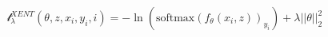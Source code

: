 \documentclass[preview]{standalone}
\begin{document}
\begin{align*}
\mathcal{l}_{\lambda}^{XENT}(\theta, z, x_i, y_i, i) = - \ln(\text{softmax}(f_{\theta}(x_i, z))_{y_i}) + \lambda \left|\left| \theta \right|\right|_2^2
\end{align*}
\end{document}
